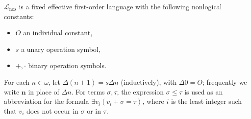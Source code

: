 $\mathcal{L}_{\text{nos}}$ is a fixed effective first-order language with the following nonlogical constants:

\begin{itemize}
\item $O$ an individual constant,
\item $s$ a unary operation symbol,
\item $+, \cdot$ binary operation symbols.
\end{itemize}

For each $n \in \omega$, let $\Delta(n + 1) = s\Delta n$ (inductively), with $\Delta 0 = O$; frequently we write $\mathbf{n}$ in place of $\Delta n$. For terms $\sigma, \tau$, the expression $\sigma \leq \tau$ is used as an abbreviation for the formula $\exists v_i(v_i + \sigma = \tau)$, where $i$ is the least integer such that $v_i$ does not occur in $\sigma$ or in $\tau$.

